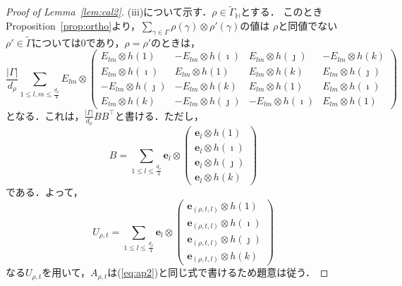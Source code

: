 \documentclass[11pt]{article}
\theoremstyle{definition}
\begin{document}
\begin{proof}[Proof of Lemma~\ref{lem:cal2}]
    (iii)について示す．$\rho \in \tilde{\Gamma}_\mathbb{H}$とする．
    このときProposition~\ref{prop:ortho}より，$\sum_{\gamma \in \Gamma} \rho(\gamma) \otimes \rho'(\gamma)$の値は
    $\rho$と同値でない$\rho' \in \tilde{\Gamma}$については$0$であり，$\rho=\rho'$のときは，
    \[
        \frac{|\Gamma|}{d_\rho} \sum_{1 \leq l,m \leq \frac{d_\rho}{4}} E_{lm} \otimes \begin{pmatrix}
             E_{lm} \otimes h(1) & -E_{lm} \otimes h(\imath) & E_{lm} \otimes h(\jmath) & -E_{lm} \otimes h(k) \\ 
             E_{lm} \otimes h(\imath) & E_{lm} \otimes h(1) & E_{lm} \otimes h(k) & E_{lm} \otimes h(\jmath) \\
            -E_{lm} \otimes h(\jmath) & -E_{lm} \otimes h(k) & E_{lm} \otimes h(1) & E_{lm} \otimes h(\imath) \\
             E_{lm} \otimes h(k) & -E_{lm} \otimes h(\jmath) &-E_{lm} \otimes h(\imath) & E_{lm} \otimes h(1)
        \end{pmatrix}
    \]
    となる．これは，$\frac{|\Gamma|}{d_\rho} B B^\top$と書ける．ただし，
    \[
    B = \sum_{1 \leq l \leq \frac{d_\rho}{4}} \bm{e}_l \otimes \begin{pmatrix} \bm{e}_l\otimes h(1) \\ \bm{e}_l\otimes h(\imath) 
    \\ \bm{e}_l\otimes h(\jmath) \\ \bm{e}_l\otimes h(k) \end{pmatrix}
    \]
    である．よって，
    \[
        U_{\rho,t} = \sum_{1 \leq l \leq \frac{d_\rho}{4}} \bm{e}_l \otimes \begin{pmatrix} \bm{e}_{(\rho,t,l)}\otimes h(1) \\ \bm{e}_{(\rho,t,l)}\otimes h(\imath) 
        \\ \bm{e}_{(\rho,t,l)}\otimes h(\jmath) \\ \bm{e}_{(\rho,t,l)}\otimes h(k) \end{pmatrix}
    \]
    なる$U_{\rho,t}$を用いて，$A_{\rho,t}$は(\ref{eq:ap2})と同じ式で書けるため題意は従う．
\end{proof}
\end{document}
